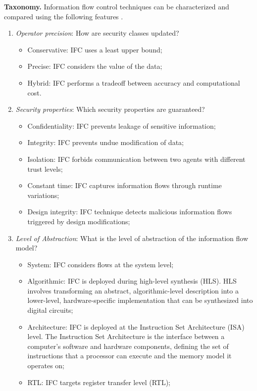  \textbf{Taxonomy.} Information flow control techniques can be characterized and compared using the following features \cite{Denning1976, Hu2021}. 
\begin{enumerate}
    \item \emph{Operator precision}: How are security classes updated? 
    \begin{itemize}
        \item Conservative: IFC uses a least upper bound;
        \item Precise: IFC considers the value of the data;
        \item Hybrid: IFC performs a tradeoff between accuracy and computational cost.
    \end{itemize}
    \item \emph{Security properties}: Which security properties are guaranteed?
    \begin{itemize}
        \item Confidentiality: IFC prevents leakage of sensitive information;
        \item Integrity: IFC prevents undue modification of data;
        \item Isolation: IFC forbids communication between two agents with different trust levels;
        \item Constant time: IFC captures information flows through runtime variations;
        \item Design integrity: IFC technique detects malicious information flows triggered by design modifications;
    \end{itemize}
    \item \emph{Level of Abstraction}: What is the level of abstraction of the information flow model?
    \begin{itemize}
        \item System: IFC considers flows at the system level;
        \item Algorithmic: IFC is deployed during high-level synthesis (HLS). 
        HLS involves transforming an abstract, algorithmic-level description into a lower-level, hardware-specific implementation that can be synthesized into digital circuits;
        \item Architecture: IFC is deployed at the Instruction Set Architecture (ISA) level. 
        The Instruction Set Architecture is the interface between a computer's software and hardware components, defining the set of instructions that a processor can execute and the memory model it operates on;
        \item RTL: IFC targets register transfer level (RTL);

\end{itemize}
\end{enumerate}
